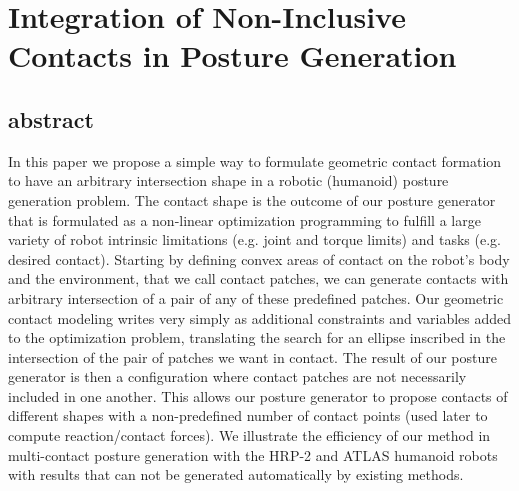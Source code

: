 \chapter{Integration of Non-Inclusive Contacts in Posture Generation}

\section{abstract}
In this paper we propose a simple way to formulate geometric contact formation to have an arbitrary intersection shape in a robotic (humanoid) posture generation problem. The contact shape is the outcome of our posture generator that is formulated as a non-linear optimization programming to fulfill a large variety of robot intrinsic limitations (e.g. joint and torque limits) and tasks (e.g. desired contact). Starting by defining convex areas of contact on the robot's body and the environment, that we call contact patches, we can generate contacts with arbitrary intersection of a pair of any of these predefined patches. Our geometric contact modeling writes very simply as additional constraints and variables added to the optimization problem, translating the search for an ellipse inscribed in the intersection of the pair of patches we want in contact. The result of our posture generator is then a configuration where contact patches are not necessarily included in one another. This allows our posture generator to propose contacts of different shapes with a non-predefined number of contact points (used later to compute reaction/contact forces). We illustrate the efficiency of our method in multi-contact posture generation with the HRP-2 and ATLAS humanoid robots with results that can not be generated automatically by existing methods.


